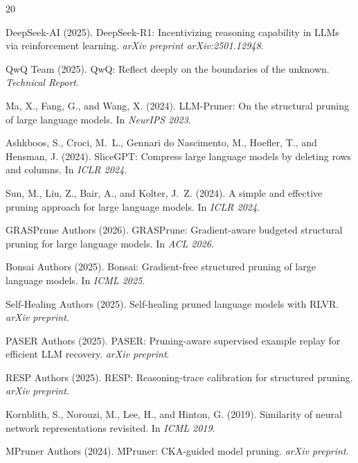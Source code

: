 \documentclass[11pt,a4paper]{article}
\begin{document}
\begin{thebibliography}{20}

DeepSeek-AI (2025).
DeepSeek-R1: Incentivizing reasoning capability in LLMs via reinforcement learning.
\emph{arXiv preprint arXiv:2501.12948}.

QwQ Team (2025).
QwQ: Reflect deeply on the boundaries of the unknown.
\emph{Technical Report}.

Ma, X., Fang, G., and Wang, X. (2024).
LLM-Pruner: On the structural pruning of large language models.
In \emph{NeurIPS 2023}.

Ashkboos, S., Croci, M.~L., Gennari do Nascimento, M., Hoefler, T., and Hensman, J. (2024).
SliceGPT: Compress large language models by deleting rows and columns.
In \emph{ICLR 2024}.

Sun, M., Liu, Z., Bair, A., and Kolter, J.~Z. (2024).
A simple and effective pruning approach for large language models.
In \emph{ICLR 2024}.

GRASPrune Authors (2026).
GRASPrune: Gradient-aware budgeted structural pruning for large language models.
In \emph{ACL 2026}.

Bonsai Authors (2025).
Bonsai: Gradient-free structured pruning of large language models.
In \emph{ICML 2025}.

Self-Healing Authors (2025).
Self-healing pruned language models with RLVR.
\emph{arXiv preprint}.

PASER Authors (2025).
PASER: Pruning-aware supervised example replay for efficient LLM recovery.
\emph{arXiv preprint}.

RESP Authors (2025).
RESP: Reasoning-trace calibration for structured pruning.
\emph{arXiv preprint}.

Kornblith, S., Norouzi, M., Lee, H., and Hinton, G. (2019).
Similarity of neural network representations revisited.
In \emph{ICML 2019}.

MPruner Authors (2024).
MPruner: CKA-guided model pruning.
\emph{arXiv preprint}.

\end{thebibliography}
\end{document}

